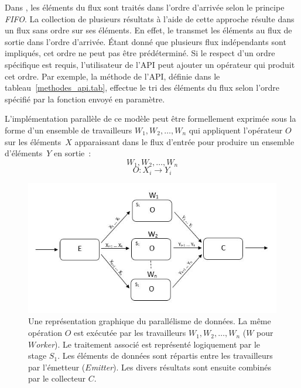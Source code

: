 Dans , les \'el\'ements du flux sont trait\'es dans l'ordre d'arriv\'ee selon le principe \emph{FIFO}. La collection de plusieurs r\'esultats \`a l'aide de cette approche r\'esulte dans un flux sans ordre sur ses \'el\'ements. En effet, le  transmet les \'el\'ements au flux de sortie dans l'ordre d'arriv\'ee. \'Etant donn\'e que plusieurs flux ind\'ependants sont impliqu\'es, cet ordre ne peut pas \^etre pr\'ed\'etermin\'e. Si le respect d'un  ordre sp\'ecifique est requis, l'utilisateur de l'API peut ajouter un op\'erateur qui produit cet ordre. Par exemple, la m\'ethode  de l'API, d\'efinie dans le tableau~\ref{methodes_api.tab}, effectue le tri des \'el\'ements du flux selon l'ordre sp\'ecifi\'e par la fonction  envoy\'e en param\`etre.

\goodbreak
%
\begin{samepage}

L'impl\'ementation parall\`ele de ce mod\`ele peut \^etre formellement
exprim\'ee sous la forme d'un ensemble de travailleurs $W_1, W_2,\ldots, W_n$ qui
appliquent l'op\'erateur $O$ sur les \'el\'ements~$X$ apparaissant dans
le flux d'entr\'ee pour produire un ensemble d'\'el\'ements~$Y$ en sortie~:
%
\[
	W_1, W_2,\ldots, W_n
\]
%
\[
	O : X_i \rightarrow Y_i
\]
\end{samepage}

\begin{figure}[ht]
\centering
     \includegraphics[width=1.0\textwidth]{Figures/DataParallelisme.jpg}
      \caption[Une repr\'esentation graphique du parall\'elisme de donn\'ees.]{Une repr\'esentation graphique du parall\'elisme de donn\'ees. La m\^eme op\'eration $O$ est ex\'ecut\'ee par les travailleurs $W_1, W_2,\ldots, W_n$ ($W$ pour \emph{$W$orker}). Le traitement associ\'e est repr\'esent\'e logiquement par le stage $S_1$. Les \'el\'ements de donn\'ees sont r\'epartis entre les travailleurs par l'\'emetteur ($E$\emph{mitter}). Les divers r\'esultats sont ensuite combin\'es par le collecteur $C$.}
       \label{DataParallelisme.fig}
\end{figure}


